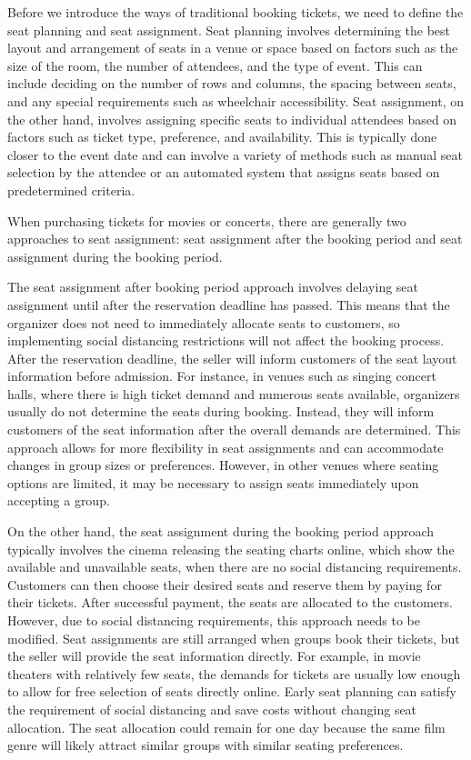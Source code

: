 Before we introduce the ways of traditional booking tickets, we need to define the seat planning and seat assignment. Seat planning involves determining the best layout and arrangement of seats in a venue or space based on factors such as the size of the room, the number of attendees, and the type of event. This can include deciding on the number of rows and columns, the spacing between seats, and any special requirements such as wheelchair accessibility. Seat assignment, on the other hand, involves assigning specific seats to individual attendees based on factors such as ticket type, preference, and availability. This is typically done closer to the event date and can involve a variety of methods such as manual seat selection by the attendee or an automated system that assigns seats based on predetermined criteria.


When purchasing tickets for movies or concerts, there are generally two approaches to seat assignment: seat assignment after the booking period and seat assignment during the booking period.

The seat assignment after booking period approach involves delaying seat assignment until after the reservation deadline has passed. This means that the organizer does not need to immediately allocate seats to customers, so implementing social distancing restrictions will not affect the booking process. After the reservation deadline, the seller will inform customers of the seat layout information before admission. For instance, in venues such as singing concert halls, where there is high ticket demand and numerous seats available, organizers usually do not determine the seats during booking. Instead, they will inform customers of the seat information after the overall demands are determined. This approach allows for more flexibility in seat assignments and can accommodate changes in group sizes or preferences. However, in other venues where seating options are limited, it may be necessary to assign seats immediately upon accepting a group.

On the other hand, the seat assignment during the booking period approach typically involves the cinema releasing the seating charts online, which show the available and unavailable seats, when there are no social distancing requirements. Customers can then choose their desired seats and reserve them by paying for their tickets. After successful payment, the seats are allocated to the customers. However, due to social distancing requirements, this approach needs to be modified. Seat assignments are still arranged when groups book their tickets, but the seller will provide the seat information directly. For example, in movie theaters with relatively few seats, the demands for tickets are usually low enough to allow for free selection of seats directly online. Early seat planning can satisfy the requirement of social distancing and save costs without changing seat allocation. The seat allocation could remain for one day because the same film genre will likely attract similar groups with similar seating preferences.



